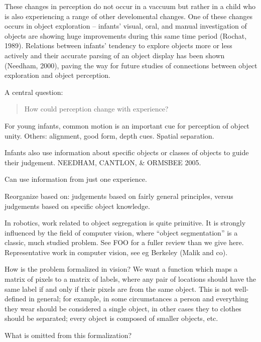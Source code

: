 These changes in perception do not occur in a vaccuum but rather in a
child who is also experiencing a range of other develomental changes.
One of these changes occurs in object
exploration -- infants' visual, oral, and manual
investigation of objects are showing huge improvements during this
same time period (Rochat, 1989).  Relations between infants'
tendency to explore objects more or less actively and their accurate
parsing of an object display has been shown (Needham, 2000), paving
the way for future studies of connections between object exploration
and object perception.




A central question:

\begin{quote}

How could perception change with experience?

\end{quote}





For young infants, common motion is an important cue for 
perception of object unity.  Others: alignment, good form,
depth cues.  Spatial separation.

Infants also use information about specific objects or
classes of objects to guide their judgement.  
NEEDHAM, CANTLON, \& ORMSBEE 2005.

Can use information from just one experience.

Reorganize based on: judgements based on fairly general
principles, versus judgements based on specific object
knowledge.

In robotics, work related to object segregation is quite
primitive.  It is strongly influenced by the field
of computer vision, where ``object segmentation'' is a classic,
much studied problem.  See FOO for a fuller review than we give
here.  Representative work in computer vision,
see eg Berkeley (Malik and co).

How is the problem formalized in vision?  We want a function
which maps a matrix of pixels to a matrix of labels, where
any pair of locations should have the same label if and
only if their pixels are from the same object.
This is not well-defined in general; for example, in some
circumstances a person and everything they wear should be
considered a single object, in other cases they to clothes
should be separated; every object is composed of smaller
objects, etc.

What is omitted from this formalization?

